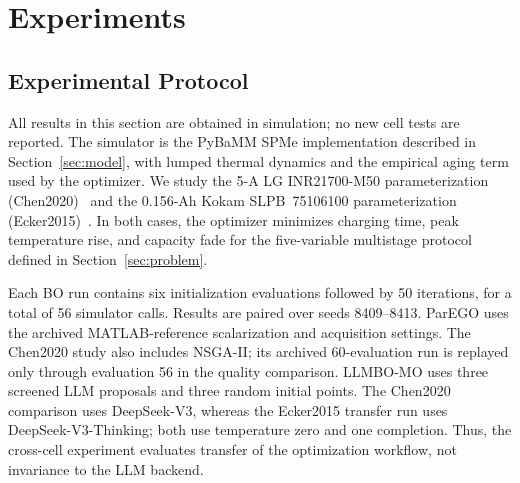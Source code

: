 

\section{Experiments}
\label{sec:experiments}

\subsection{Experimental Protocol}

All results in this section are obtained in simulation; no new cell tests are
reported. The simulator is the PyBaMM SPMe implementation described in
Section~\ref{sec:model}, with lumped thermal dynamics and the empirical aging
term used by the optimizer. We study the 5-A LG INR21700-M50 parameterization
(Chen2020)~\cite{ref13} and the 0.156-Ah Kokam SLPB~75106100
parameterization (Ecker2015)~\cite{ref14}. In both cases, the optimizer
minimizes charging time, peak temperature rise, and capacity fade for the
five-variable multistage protocol defined in Section~\ref{sec:problem}.

Each BO run contains six initialization evaluations followed by 50
iterations, for a total of 56 simulator calls. Results are paired over seeds
8409--8413. ParEGO uses the archived MATLAB-reference scalarization and
acquisition settings. The Chen2020 study also includes NSGA-II; its archived
60-evaluation run is replayed only through evaluation 56 in the quality
comparison. LLMBO-MO uses three screened LLM proposals and three random
initial points. The Chen2020 comparison uses DeepSeek-V3, whereas the
Ecker2015 transfer run uses DeepSeek-V3-Thinking; both use temperature zero
and one completion. Thus, the cross-cell experiment evaluates transfer of
the optimization workflow, not invariance to the LLM backend.

